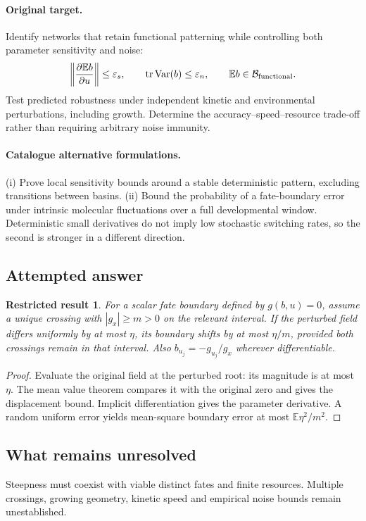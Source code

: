 \documentclass[11pt]{article}
\newcommand{\E}{\mathbb E}
\DeclareMathOperator{\Var}{Var}
\providecommand{\E}{\mathbb E}
\providecommand{\Var}{\operatorname{Var}}
\newtheorem{attemptresult}{Restricted result}[section]
\begin{document}
\paragraph{Original target.}
Identify networks that retain functional patterning while controlling both parameter sensitivity and noise:
\[
\left\|\frac{\partial\E b}{\partial u}\right\|\leq\varepsilon_s,
\qquad
\operatorname{tr}\Var(b)\leq\varepsilon_n,
\qquad
\E b\in\mathcal B_{\rm functional}.
\]
Test predicted robustness under independent kinetic and environmental perturbations, including growth. Determine the accuracy--speed--resource trade-off rather than requiring arbitrary noise immunity.
\paragraph{Catalogue alternative formulations.}
(i) Prove local sensitivity bounds around a stable deterministic pattern, excluding transitions between basins. (ii) Bound the probability of a fate-boundary error under intrinsic molecular fluctuations over a full developmental window. Deterministic small derivatives do not imply low stochastic switching rates, so the second is stronger in a different direction.
\subsection{Attempted answer}
\begin{attemptresult}
For a scalar fate boundary defined by $g(b,u)=0$, assume a unique crossing with $|g_x|\geq m>0$ on the relevant interval. If the perturbed field differs uniformly by at most $\eta$, its boundary shifts by at most $\eta/m$, provided both crossings remain in that interval. Also $b_{u_j}=-g_{u_j}/g_x$ wherever differentiable.
\end{attemptresult}
\begin{proof}
Evaluate the original field at the perturbed root: its magnitude is at most $\eta$. The mean value theorem compares it with the original zero and gives the displacement bound. Implicit differentiation gives the parameter derivative. A random uniform error yields mean-square boundary error at most $\E\eta^2/m^2$.
\end{proof}
\subsection{What remains unresolved}
Steepness must coexist with viable distinct fates and finite resources. Multiple crossings, growing geometry, kinetic speed and empirical noise bounds remain unestablished.
\end{document}
